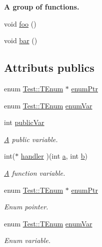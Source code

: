 \begin{Indent}{\bf A group of functions.}\par
\begin{DoxyCompactItemize}
\item 
void \hyperlink{class_test_a3296012eb76649622984234e2bb64a96}{foo} ()
\item 
void \hyperlink{class_test_a32a5254aa4ef1b634875e8680c76cc49}{bar} ()
\end{DoxyCompactItemize}
\end{Indent}
\subsection*{Attributs publics}
\begin{DoxyCompactItemize}
\item 
enum \hyperlink{class_test_ad8d13fe56b896633273087859b89a1a3}{Test\+::\+T\+Enum}           $\ast$ \hyperlink{class_test_a925298f6827949201a04bdb1fb47e44e}{enum\+Ptr}
\item 
enum \hyperlink{class_test_ad8d13fe56b896633273087859b89a1a3}{Test\+::\+T\+Enum}           \hyperlink{class_test_aa8fb3741660af1c519a5fe11f0c9e699}{enum\+Var}
\item 
int \hyperlink{class_test_aba22fd8dcb6ca747e2266fadaf5bc383}{public\+Var}
\begin{DoxyCompactList}\small\item\em \hyperlink{class_a}{A} public variable. \end{DoxyCompactList}\item 
int($\ast$ \hyperlink{class_test_a2ce50e60d16f5071772c6acde08181bd}{handler} )(int \hyperlink{060__command__switch_8tcl_ab08ae027fc5777bc4f0629f1b60b35db}{a}, int \hyperlink{060__command__switch_8tcl_a68bdb74c144118d936931c46f75d4b3e}{b})
\begin{DoxyCompactList}\small\item\em \hyperlink{class_a}{A} function variable. \end{DoxyCompactList}\item 
enum \hyperlink{class_test_ad8d13fe56b896633273087859b89a1a3}{Test\+::\+T\+Enum}               $\ast$ \hyperlink{class_test_a5142e5baf3def5de252b35d1626b8f7b}{enum\+Ptr}
\begin{DoxyCompactList}\small\item\em Enum pointer. \end{DoxyCompactList}\item 
enum \hyperlink{class_test_ad8d13fe56b896633273087859b89a1a3}{Test\+::\+T\+Enum}               \hyperlink{class_test_ad27c261f542747a0a9e8f03b19d0e8cc}{enum\+Var}
\begin{DoxyCompactList}\small\item\em Enum variable. \end{DoxyCompactList}\end{DoxyCompactItemize}
